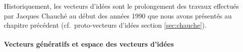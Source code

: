 {Historiquement, les vecteurs d'idées sont le
prolongement des travaux effectués par  Jacques
Chauché au début des années 1990 que nous avons présentés au chapitre
précédent (cf.~proto-vecteurs d'idées section \ref{sec:chauche}). 
%


\paragraph{Vecteurs génératifs et espace des vecteurs d'idées}

}
